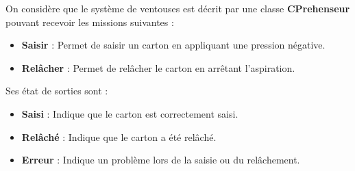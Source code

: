On considère que le système de ventouses est décrit par une classe \textbf{CPrehenseur} pouvant recevoir les missions suivantes :

\begin{itemize}
    \item \textbf{Saisir} : Permet de saisir un carton en appliquant une pression négative.
    \item \textbf{Relâcher} : Permet de relâcher le carton en arrêtant l'aspiration.
\end{itemize}

Ses état de sorties sont : 
\begin{itemize}
    \item \textbf{Saisi} : Indique que le carton est correctement saisi.
    \item \textbf{Relâché} : Indique que le carton a été relâché.
    \item \textbf{Erreur} : Indique un problème lors de la saisie ou du relâchement.
\end{itemize}


